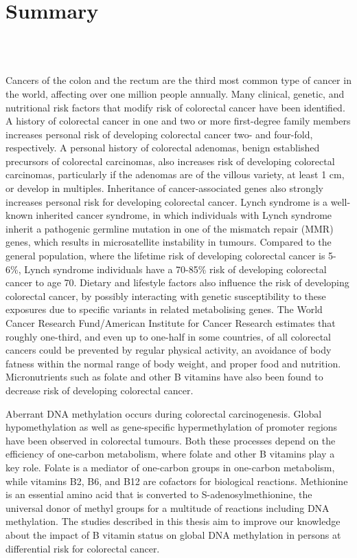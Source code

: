 \chapter*{Summary}
\label{summary}

\quad\\

\quad\\

\newpage

\noindent Cancers of the colon and the rectum are the third most common type of cancer in the world, affecting over one million people annually. Many clinical, genetic, and nutritional risk factors that modify risk of colorectal cancer have been identified. A history of colorectal cancer in one and two or more first-degree family members increases personal risk of developing colorectal cancer two- and four-fold, respectively. A personal history of colorectal adenomas, benign established precursors of colorectal carcinomas, also increases risk of developing colorectal carcinomas, particularly if the adenomas are of the villous variety, at least 1 cm, or develop in multiples. Inheritance of cancer-associated genes also strongly increases personal risk for developing colorectal cancer. Lynch syndrome is a well-known inherited cancer syndrome, in which individuals with Lynch syndrome inherit a pathogenic germline mutation in one of the mismatch repair (MMR) genes, which results in microsatellite instability in tumours. Compared to the general population, where the lifetime risk of developing colorectal cancer is 5-6\%, Lynch syndrome individuals have a 70-85\% risk of developing colorectal cancer to age 70. Dietary and lifestyle factors also influence the risk of developing colorectal cancer, by possibly interacting with genetic susceptibility to these exposures due to specific variants in related metabolising genes. The World Cancer Research Fund/American Institute for Cancer Research estimates that roughly one-third, and even up to one-half in some countries, of all colorectal cancers could be prevented by regular physical activity, an avoidance of body fatness within the normal range of body weight, and proper food and nutrition. Micronutrients such as folate and other B vitamins have also been found to decrease risk of developing colorectal cancer.

\noindent Aberrant DNA methylation occurs during colorectal carcinogenesis. Global hypomethylation as well as gene-specific hypermethylation of promoter regions have been observed in colorectal tumours. Both these processes depend on the efficiency of one-carbon metabolism, where folate and other B vitamins play a key role. Folate is a mediator of one-carbon groups in one-carbon metabolism, while vitamins B2, B6, and B12 are cofactors for biological reactions. Methionine is an essential amino acid that is converted to S-adenosylmethionine, the universal donor of methyl groups for a multitude of reactions including DNA methylation. The studies described in this thesis aim to improve our knowledge about the impact of B vitamin status on global DNA methylation in persons at differential risk for colorectal cancer.

